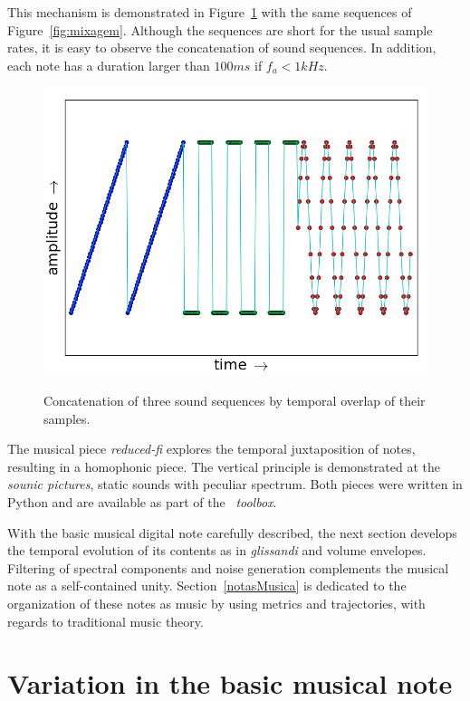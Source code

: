 This mechanism is demonstrated in Figure~\ref{fig:concatenacao} with the same sequences of Figure~\ref{fig:mixagem}. Although the sequences are short for the usual sample rates, it is easy to observe the concatenation of sound sequences. In addition, each note has a duration larger than $100ms$ if $f_a<1kHz$.

\begin{figure}[h!]
{    \centering
        \includegraphics[width=.5\columnwidth]{figures/concatenacao_}}
    \caption{Concatenation of three sound sequences by temporal overlap of their samples.}
        \label{fig:concatenacao}
\end{figure}

The musical piece \emph{reduced-fi} explores the temporal juxtaposition of notes, resulting in a homophonic piece. The vertical principle is demonstrated at the \emph{sounic pictures}, static sounds with peculiar spectrum. Both pieces were written in Python and are available as part of the \massa\ \emph{toolbox}.\cite{MASSA}

With the basic musical digital note carefully described, the next section develops the temporal evolution of its contents as in \emph{glissandi} and volume envelopes. Filtering of spectral components and noise generation complements the musical note as a self-contained unity. Section~\ref{notasMusica} is dedicated to the organization of these notes as music by using metrics and trajectories, with regards to traditional music theory.



\section{Variation in the basic musical note}\label{sec:internalVar}\label{sec:varInternas}


